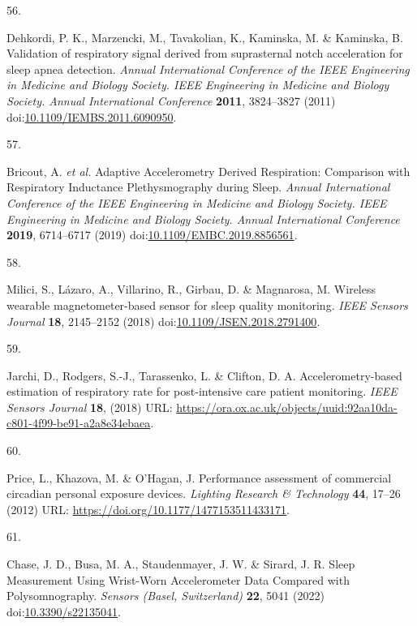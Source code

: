 \documentclass[
  9pt,
]{scrbook}
\newlength{\cslhangindent}
\newlength{\csllabelwidth}
\newlength{\cslentryspacingunit} %
\newenvironment{CSLReferences}[2] %
 {%
  \setlength{\parindent}{0pt}
  \ifodd #1
  \let\oldpar\par
  \def\par{\hangindent=\cslhangindent\oldpar}
  \fi
  \setlength{\parskip}{#2\cslentryspacingunit}
 }%
 {}
\newcommand{\CSLLeftMargin}[1]{\parbox[t]{\csllabelwidth}{#1}}
\newcommand{\CSLRightInline}[1]{\parbox[t]{\linewidth - \csllabelwidth}{#1}\break}
\begin{document}
\begin{CSLReferences}{0}{0}
\leavevmode{}%
\CSLLeftMargin{56. }%
\CSLRightInline{Dehkordi, P. K., Marzencki, M., Tavakolian, K.,
Kaminska, M. \& Kaminska, B. Validation of respiratory signal derived
from suprasternal notch acceleration for sleep apnea detection.
\emph{Annual International Conference of the IEEE Engineering in
Medicine and Biology Society. IEEE Engineering in Medicine and Biology
Society. Annual International Conference} \textbf{2011}, 3824--3827
(2011)
doi:\href{https://doi.org/10.1109/IEMBS.2011.6090950}{10.1109/IEMBS.2011.6090950}.}

\leavevmode{}%
\CSLLeftMargin{57. }%
\CSLRightInline{Bricout, A. \emph{et al.} Adaptive Accelerometry Derived
Respiration: Comparison with Respiratory Inductance Plethysmography
during Sleep. \emph{Annual International Conference of the IEEE
Engineering in Medicine and Biology Society. IEEE Engineering in
Medicine and Biology Society. Annual International Conference}
\textbf{2019}, 6714--6717 (2019)
doi:\href{https://doi.org/10.1109/EMBC.2019.8856561}{10.1109/EMBC.2019.8856561}.}

\leavevmode{}%
\CSLLeftMargin{58. }%
\CSLRightInline{Milici, S., Lázaro, A., Villarino, R., Girbau, D. \&
Magnarosa, M. Wireless wearable magnetometer-based sensor for sleep
quality monitoring. \emph{IEEE Sensors Journal} \textbf{18}, 2145--2152
(2018)
doi:\href{https://doi.org/10.1109/JSEN.2018.2791400}{10.1109/JSEN.2018.2791400}.}

\leavevmode{}%
\CSLLeftMargin{59. }%
\CSLRightInline{Jarchi, D., Rodgers, S.-J., Tarassenko, L. \& Clifton,
D. A. Accelerometry-based estimation of respiratory rate for
post-intensive care patient monitoring. \emph{IEEE Sensors Journal}
\textbf{18}, (2018) URL:
\url{https://ora.ox.ac.uk/objects/uuid:92aa10da-c801-4f99-be91-a2a8e34ebaea}.}

\leavevmode{}%
\CSLLeftMargin{60. }%
\CSLRightInline{Price, L., Khazova, M. \& O'Hagan, J. Performance
assessment of commercial circadian personal exposure devices.
\emph{Lighting Research \& Technology} \textbf{44}, 17--26 (2012) URL:
\url{https://doi.org/10.1177/1477153511433171}.}

\leavevmode{}%
\CSLLeftMargin{61. }%
\CSLRightInline{Chase, J. D., Busa, M. A., Staudenmayer, J. W. \&
Sirard, J. R. Sleep Measurement Using Wrist-Worn Accelerometer Data
Compared with Polysomnography. \emph{Sensors (Basel, Switzerland)}
\textbf{22}, 5041 (2022)
doi:\href{https://doi.org/10.3390/s22135041}{10.3390/s22135041}.}


\end{CSLReferences}
\end{document}
